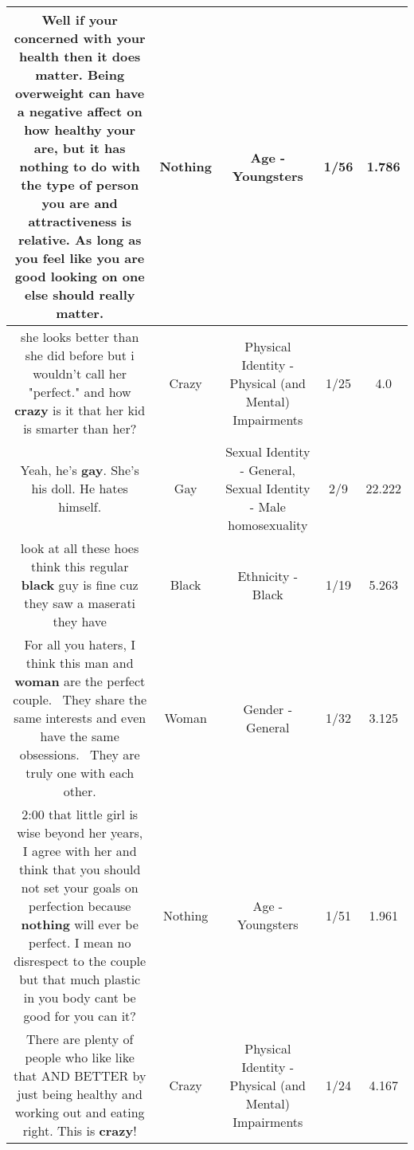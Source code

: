 \documentclass[11pt]{article}
\newlength\mylength
\begin{document}
\begin{center}
\begin{longtable}{|C{.65\mylength}|C{.30\mylength}|C{.12\mylength}|C{.12\mylength}|C{.12\mylength}|}
  \small Well if your concerned with your health then it does matter. Being overweight can have a negative affect on how healthy your are, but it has \textbf{nothing} to do with the type of person you are and attractiveness is relative. As long as you feel like you are good looking on one else should really matter.\normalsize   & Nothing & Age - Youngsters & 1/56 & 1.786 \\  \hline
  \small she looks better than she did before but i wouldn't call her "perfect." and how \textbf{crazy} is it that her kid is smarter than her?\normalsize   & Crazy & Physical Identity - Physical (and Mental) Impairments & 1/25 & 4.0 \\  \hline
  \small Yeah, he's \textbf{g\textbf{ay}}. She's his doll. He hates himself.\normalsize   & Gay & Sexual Identity - General, Sexual Identity - Male homosexuality & 2/9 & 22.222 \\  \hline
  \small look at all these hoes think this regular \textbf{black} guy is fine cuz they saw a maserati they have\normalsize   & Black & Ethnicity - Black & 1/19 & 5.263 \\  \hline
  \small For all you haters, I think this man and \textbf{woman} are the perfect couple.  They share the same interests and even have the same obsessions.  They are truly one with each other.\normalsize   & Woman & Gender - General & 1/32 & 3.125 \\  \hline
  \small 2:00 that little girl is wise beyond her years, I agree with her and think that you should not set your goals on perfection because \textbf{nothing} will ever be perfect. I mean no disrespect to the couple but that much plastic in you body cant be good for you can it?\normalsize   & Nothing & Age - Youngsters & 1/51 & 1.961 \\  \hline
  \small There are plenty of people who like like that AND BETTER by just being healthy and working out and eating right. This is \textbf{crazy}!\normalsize   & Crazy & Physical Identity - Physical (and Mental) Impairments & 1/24 & 4.167 \\  \hline

\end{longtable}
\end{center}
\end{document}
